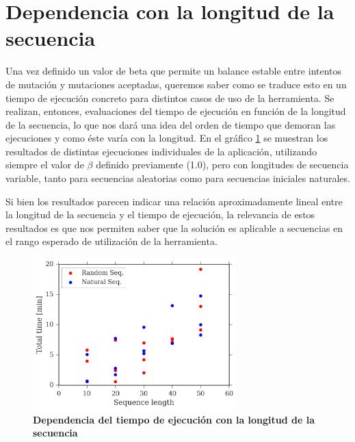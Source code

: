 \section{Dependencia con la longitud de la secuencia}

Una vez definido un valor de beta que permite un balance estable entre intentos de mutación y mutaciones aceptadas, queremos saber como se traduce esto en un tiempo de ejecución concreto para distintos casos de uso de la herramienta.
Se realizan, entonces, evaluaciones del tiempo de ejecución en función de la longitud de la secuencia, lo que nos dará una idea del orden de tiempo que demoran las ejecuciones y como éste varía con la longitud.
En el gráfico \ref{fig:time-vs-length} se muestran los resultados de distintas ejecuciones individuales de la aplicación, utilizando siempre el valor de $\beta$ definido previamente (1.0), pero con longitudes de secuencia variable, 
tanto para secuencias aleatorias como para secuencias iniciales naturales.

Si bien los resultados parecen indicar una relación aproximadamente lineal entre la longitud de la secuencia y el tiempo de ejecución, la relevancia de estos resultados es que nos permiten 
saber que la solución es aplicable a secuencias en el rango esperado de utilización de la herramienta. 

\begin{figure}[htbp]
\centering
\includegraphics[width=0.7\textwidth]{img/resultados/lengthVsTime.png}
\caption{\textbf{Dependencia del tiempo de ejecución con la longitud de la secuencia}}
\label{fig:time-vs-length}
\end{figure}





